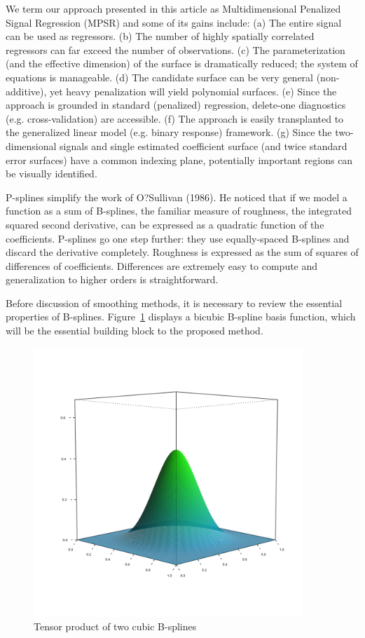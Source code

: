 \documentclass[12pt]{article}
\newcommand*\needsparaphrased{\color{red}}
\begin{document}
{We term our approach presented in this article as Multidimensional Penalized Signal Regression (MPSR) and some of its gains include: (a) The entire signal can be used as regressors. (b) The number of highly spatially correlated regressors can far exceed the number of observations. (c) The parameterization (and the effective dimension) of the surface is dramatically reduced; the system of equations is manageable. (d) The candidate surface can be very general (non-additive), yet heavy penalization will yield polynomial surfaces. (e) Since the approach is grounded in standard (penalized) regression, delete-one diagnostics (e.g. cross-validation) are accessible. (f) The approach is easily transplanted to the generalized linear model (e.g. binary response) framework. (g) Since the two-dimensional signals and single estimated coefficient surface (and twice standard error surfaces) have a common indexing plane, potentially important regions can be visually identified.}

{\needsparaphrased P-splines simplify the work of O?Sullivan (1986). He noticed that if we model a function as a sum of B-splines, the familiar measure of roughness, the integrated squared
second derivative, can be expressed as a quadratic function of the coefficients. P-splines go one step further: they use equally-spaced B-splines and discard the derivative completely.
Roughness is expressed as the sum of squares of differences of coefficients. Differences are extremely easy to compute and generalization to higher orders is straightforward.}

Before discussion of smoothing methods, it is necessary to review the essential properties of B-splines. Figure~\ref{fig:bicubic_bspline} displays a bicubic B-spline basis function, which will be the essential building block to the proposed method. 
\begin{figure}[H]
  \centering
 \graphicspath{{img/}}
  \includegraphics[width=4in, height=4in]{bicubic_bspline.png}
  \caption{Tensor product of two cubic B-splines}\label{fig:bicubic_bspline}
\end{figure}
\end{document}
